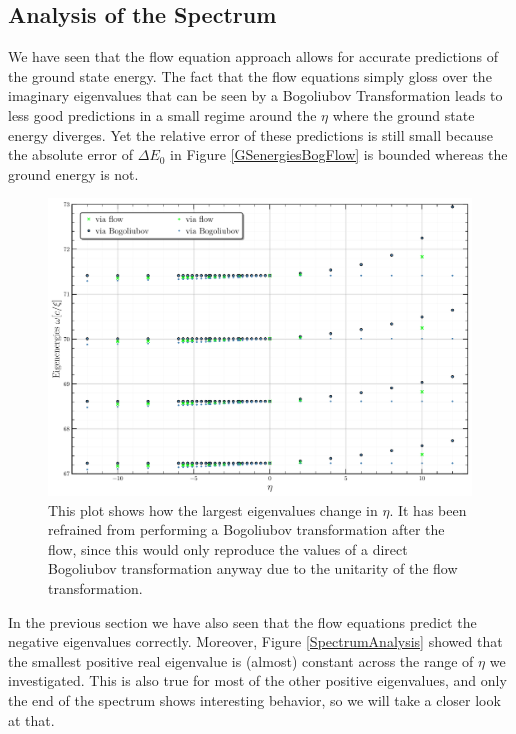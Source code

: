 \subsection{Analysis of the Spectrum}
We have seen that the flow equation approach allows for accurate predictions of the ground state energy. The fact that the flow equations simply gloss over the imaginary eigenvalues that can be seen by a Bogoliubov Transformation leads to less good predictions in a small regime around the $\eta$ where the ground state energy diverges. Yet the relative error of these predictions is still small because the absolute error of $\Delta E_0$ in Figure \ref{GSenergiesBogFlow} is bounded whereas the ground energy is not.
\begin{figure}[H]
    \centering
    \includegraphics[width=\textwidth]{figures/plots/PDF/SpectralAnalysis.pdf}
    \caption[End of the spectrum of the Hamiltonian for different $\eta$]{This plot shows how the largest eigenvalues change in $\eta$. It has been refrained from performing a Bogoliubov transformation after the flow, since this would only reproduce the values of a direct Bogoliubov transformation anyway due to the unitarity of the flow transformation.
}
    \label{EndOfSpectrumAnalysis}
\end{figure}
In the previous section we have also seen that the flow equations predict the negative eigenvalues correctly. Moreover,  Figure \ref{SpectrumAnalysis} showed that the smallest positive real eigenvalue is (almost) constant across the range of $\eta$ we investigated. This is also true for most of the other positive eigenvalues, and only the end of the spectrum shows interesting behavior, so we will take a closer look at that.
